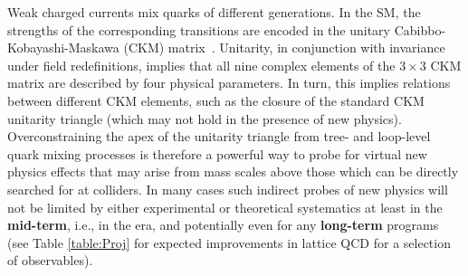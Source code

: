 \label{sec:CKM_prospects}

Weak charged currents mix quarks of different generations. In the SM, the strengths of the corresponding transitions are encoded in the unitary Cabibbo-Kobayashi-Maskawa (CKM) matrix~\cite{Cabibbo:1963yz,Kobayashi:1973fv}.
Unitarity, in conjunction with invariance under field redefinitions, implies that all nine complex elements of the  $3\times 3$ CKM matrix are described by four physical parameters. 
In turn, this implies relations between different CKM elements, such as the closure of the standard CKM unitarity triangle (which may not hold  in the presence of new physics).  
Overconstraining the apex of the unitarity triangle from tree- and loop-level quark mixing processes is therefore a powerful way to probe for virtual new physics effects that may arise from mass scales above those which can be directly searched for at colliders. In many cases such indirect probes of new physics will not be limited by either experimental or theoretical systematics at least in the {\bf mid-term}, i.e., in the \HLLHC era, and potentially even for any {\bf long-term} programs (see Table \ref{table:Proj} for expected improvements in lattice QCD for a selection of observables).


